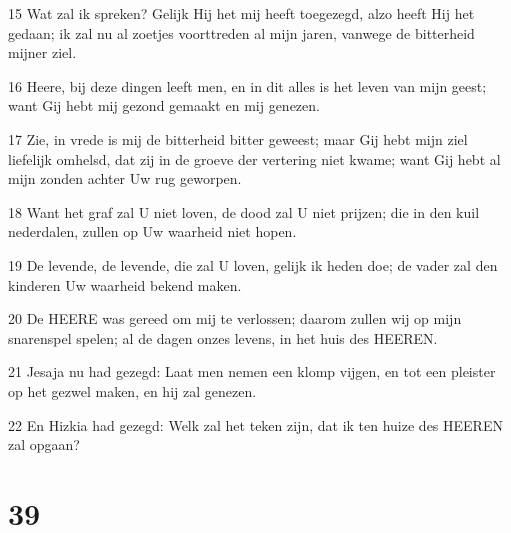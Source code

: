 \par 15 Wat zal ik spreken? Gelijk Hij het mij heeft toegezegd, alzo heeft Hij het gedaan; ik zal nu al zoetjes voorttreden al mijn jaren, vanwege de bitterheid mijner ziel.
\par 16 Heere, bij deze dingen leeft men, en in dit alles is het leven van mijn geest; want Gij hebt mij gezond gemaakt en mij genezen.
\par 17 Zie, in vrede is mij de bitterheid bitter geweest; maar Gij hebt mijn ziel liefelijk omhelsd, dat zij in de groeve der vertering niet kwame; want Gij hebt al mijn zonden achter Uw rug geworpen.
\par 18 Want het graf zal U niet loven, de dood zal U niet prijzen; die in den kuil nederdalen, zullen op Uw waarheid niet hopen.
\par 19 De levende, de levende, die zal U loven, gelijk ik heden doe; de vader zal den kinderen Uw waarheid bekend maken.
\par 20 De HEERE was gereed om mij te verlossen; daarom zullen wij op mijn snarenspel spelen; al de dagen onzes levens, in het huis des HEEREN.
\par 21 Jesaja nu had gezegd: Laat men nemen een klomp vijgen, en tot een pleister op het gezwel maken, en hij zal genezen.
\par 22 En Hizkia had gezegd: Welk zal het teken zijn, dat ik ten huize des HEEREN zal opgaan?

\chapter{39}

